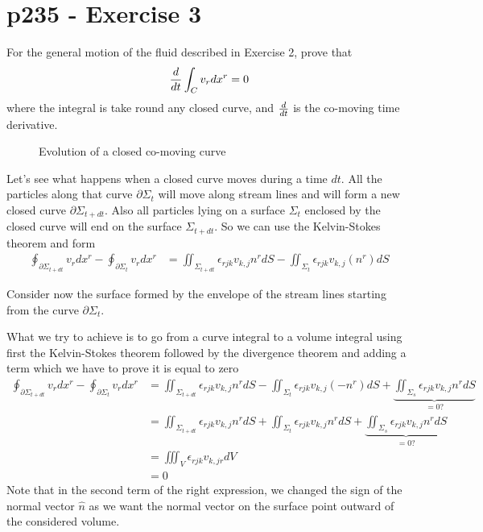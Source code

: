 \section{p235 - Exercise 3}
\begin{tcolorbox}
For the general motion of the fluid described in Exercise 2, prove that $$\dv{}{t}\int_C v_rdx^r =0$$
where the integral is take round any closed curve, and $\dv{}{t}$ is the co-moving time derivative.
\end{tcolorbox}

\begin{figure}[H]%
    \centering

\caption{Evolution of a closed co-moving curve }
\label{fig:fig_p2235}
\end{figure}
Let's see what happens when a closed  curve moves during a time $dt$. All the particles along that curve $\partial\Sigma_t$ will move along stream lines and will form a new closed curve $\partial\Sigma_{t+dt}$. Also all particles lying on a surface $\Sigma_t$ enclosed by the closed curve will end on the surface $\Sigma_{t+dt}$.
So we can use the Kelvin-Stokes theorem and form
\begin{align}
\oint_{\partial\Sigma_{t+dt} }{v_rdx^r }-\oint_{\partial\Sigma_{t}} v_rdx^r&= \iint_{\Sigma_{t+dt}}\epsilon_{rjk}v_{k,j}n^rdS-\iint_{\Sigma_{t}}\epsilon_{rjk}v_{k,j}(n^r)dS
\end{align}

Consider now the surface formed by the envelope of the stream lines starting from the curve $\partial\Sigma_t$.

What we try to achieve is to go from a curve integral to a volume integral using first the Kelvin-Stokes theorem followed by the divergence theorem and adding a term which we have to prove it is equal to zero
\begin{align}
\oint_{\partial\Sigma_{t+dt} }{v_rdx^r }-\oint_{\partial\Sigma_{t}} v_rdx^r&= \iint_{\Sigma_{t+dt}}\epsilon_{rjk}v_{k,j}n^rdS-\iint_{\Sigma_{t}}\epsilon_{rjk}v_{k,j}(-n^r)dS+\underbrace{\iint_{\Sigma_{s}}\epsilon_{rjk}v_{k,j}n^rdS}_{=0?}\\
&= \iint_{\Sigma_{t+dt}}\epsilon_{rjk}v_{k,j}n^rdS+\iint_{\Sigma_{t}}\epsilon_{rjk}v_{k,j}n^rdS+\underbrace{\iint_{\Sigma_{s}}\epsilon_{rjk}v_{k,j}n^rdS}_{=0?}\\
&= \iiint_V \epsilon_{rjk}v_{k,jr}dV\\
&=0
\end{align}
Note that in the second term of the right expression, we changed the sign of the normal vector $\hat{n}$ as we want the normal vector on the surface point outward of the considered volume.\\\\

